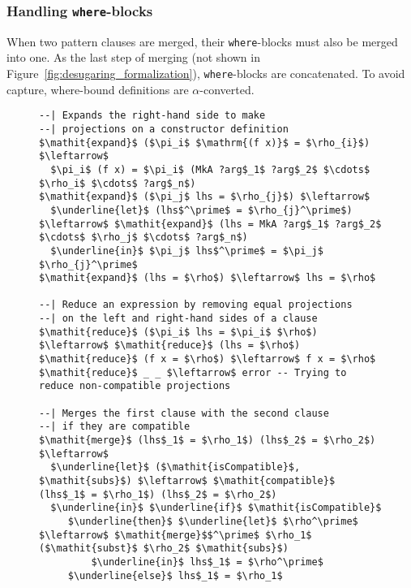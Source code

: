 \subsubsection{Handling \texttt{where}-blocks}
When two pattern clauses are merged, their \texttt{where}-blocks must also be
merged into one. As the last step of merging (not shown in
Figure~\ref{fig:desugaring_formalization}), \texttt{where}-blocks are
concatenated. To avoid capture, where-bound definitions are $\alpha$-converted.
\begin{figure}
\begin{lstlisting}[mathescape]
--| Expands the right-hand side to make 
--| projections on a constructor definition
$\mathit{expand}$ ($\pi_i$ $\mathrm{(f x)}$ = $\rho_{i}$) $\leftarrow$ 
  $\pi_i$ (f x) = $\pi_i$ (MkA ?arg$_1$ ?arg$_2$ $\cdots$ $\rho_i$ $\cdots$ ?arg$_n$)
$\mathit{expand}$ ($\pi_j$ lhs = $\rho_{j}$) $\leftarrow$ 
  $\underline{let}$ (lhs$^\prime$ = $\rho_{j}^\prime$) $\leftarrow$ $\mathit{expand}$ (lhs = MkA ?arg$_1$ ?arg$_2$ $\cdots$ $\rho_j$ $\cdots$ ?arg$_n$)
  $\underline{in}$ $\pi_j$ lhs$^\prime$ = $\pi_j$ $\rho_{j}^\prime$
$\mathit{expand}$ (lhs = $\rho$) $\leftarrow$ lhs = $\rho$

--| Reduce an expression by removing equal projections 
--| on the left and right-hand sides of a clause
$\mathit{reduce}$ ($\pi_i$ lhs = $\pi_i$ $\rho$) $\leftarrow$ $\mathit{reduce}$ (lhs = $\rho$)
$\mathit{reduce}$ (f x = $\rho$) $\leftarrow$ f x = $\rho$
$\mathit{reduce}$ _ _ $\leftarrow$ error -- Trying to reduce non-compatible projections

--| Merges the first clause with the second clause
--| if they are compatible
$\mathit{merge}$ (lhs$_1$ = $\rho_1$) (lhs$_2$ = $\rho_2$) $\leftarrow$
  $\underline{let}$ ($\mathit{isCompatible}$, $\mathit{subs}$) $\leftarrow$ $\mathit{compatible}$ (lhs$_1$ = $\rho_1$) (lhs$_2$ = $\rho_2$)
  $\underline{in}$ $\underline{if}$ $\mathit{isCompatible}$
     $\underline{then}$ $\underline{let}$ $\rho^\prime$ $\leftarrow$ $\mathit{merge}$$^\prime$ $\rho_1$ ($\mathit{subst}$ $\rho_2$ $\mathit{subs}$)
         $\underline{in}$ lhs$_1$ = $\rho^\prime$
     $\underline{else}$ lhs$_1$ = $\rho_1$


\end{lstlisting}
\end{figure}
